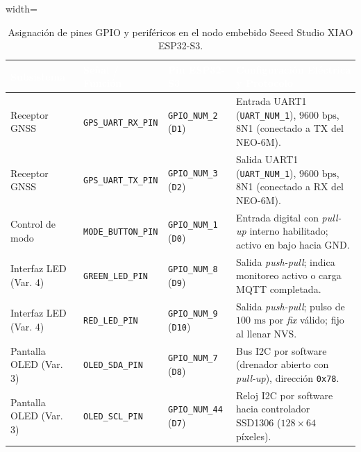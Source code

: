 \documentclass[12pt, letterpaper]{article}
\begin{document}
\begin{table}[H]
    \centering
    \renewcommand{\arraystretch}{1.5}
    \small
    \caption{Asignación de pines GPIO y periféricos en el nodo embebido Seeed Studio XIAO ESP32-S3.}
    \label{tab:pinout_esp32}
    \begin{adjustbox}{width=\textwidth}
    \begin{tabular}{|l|l|l|m{4.5cm}|}
        \hline
        \rowcolor{MidnightBlue!80}
        \textcolor{white}{\textbf{Subsistema}} & \textcolor{white}{\textbf{Señal / Función}} & \textcolor{white}{\textbf{Pin ESP32-S3}} & \textcolor{white}{\textbf{Configuración Eléctrica y Protocolo}} \\
        \hline
        Receptor GNSS & \texttt{GPS\_UART\_RX\_PIN} & \texttt{GPIO\_NUM\_2} (\texttt{D1}) & Entrada UART1 (\texttt{UART\_NUM\_1}), $9600\text{ bps}$, 8N1 (conectado a TX del NEO-6M). \\
        \hline
        Receptor GNSS & \texttt{GPS\_UART\_TX\_PIN} & \texttt{GPIO\_NUM\_3} (\texttt{D2}) & Salida UART1 (\texttt{UART\_NUM\_1}), $9600\text{ bps}$, 8N1 (conectado a RX del NEO-6M). \\
        \hline
        Control de modo & \texttt{MODE\_BUTTON\_PIN} & \texttt{GPIO\_NUM\_1} (\texttt{D0}) & Entrada digital con \textit{pull-up} interno habilitado; activo en bajo hacia GND. \\
        \hline
        Interfaz LED (Var. 4) & \texttt{GREEN\_LED\_PIN} & \texttt{GPIO\_NUM\_8} (\texttt{D9}) & Salida \textit{push-pull}; indica monitoreo activo o carga MQTT completada. \\
        \hline
        Interfaz LED (Var. 4) & \texttt{RED\_LED\_PIN} & \texttt{GPIO\_NUM\_9} (\texttt{D10}) & Salida \textit{push-pull}; pulso de $100\text{ ms}$ por \textit{fix} válido; fijo al llenar NVS. \\
        \hline
        Pantalla OLED (Var. 3) & \texttt{OLED\_SDA\_PIN} & \texttt{GPIO\_NUM\_7} (\texttt{D8}) & Bus I2C por software (drenador abierto con \textit{pull-up}), dirección \texttt{0x78}. \\
        \hline
        Pantalla OLED (Var. 3) & \texttt{OLED\_SCL\_PIN} & \texttt{GPIO\_NUM\_44} (\texttt{D7}) & Reloj I2C por software hacia controlador SSD1306 ($128 \times 64$ píxeles). \\
        \hline
    \end{tabular}
    \end{adjustbox}
\end{table}
\end{document}
